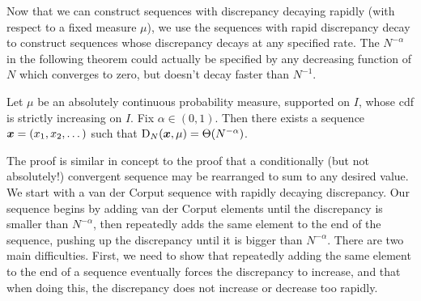 Now that we can construct sequences with discrepancy decaying rapidly (with 
respect to a fixed measure $\mu$), we use the sequences with rapid discrepancy 
decay to construct sequences whose discrepancy decays at any specified rate. 
The $N^{-\alpha}$ in the following theorem could actually be specified by any 
decreasing function of $N$ which converges to zero, but doesn't decay faster 
than $N^{-1}$. 

\begin{theorem}\label{thm:discrepancy-arbitrary}
Let $\mu$ be an absolutely continuous probability measure, supported on $I$, 
whose cdf is strictly increasing on $I$. Fix $\alpha\in (0,1)$. Then there 
exists a sequence ${\boldsymbol x}=(x_1,x_2,\dots)$ such that 
$\operatorname{D}_N({\boldsymbol x},\mu) = \Theta(N^{-\alpha})$. 
\end{theorem}

The proof is similar in concept to the proof that a conditionally (but not 
absolutely!) convergent sequence may be rearranged to sum to any desired value. 
We start with a van der Corput sequence with rapidly decaying discrepancy. Our 
sequence begins by adding van der Corput elements until the discrepancy is 
smaller than $N^{-\alpha}$, then repeatedly adds the same element to the end 
of the sequence, pushing up the discrepancy until it is bigger than 
$N^{-\alpha}$. There are two main difficulties. First, we need to show that 
repeatedly adding the same element to the end of a sequence eventually forces 
the discrepancy to increase, and that when doing this, the discrepancy does not 
increase or decrease too rapidly. 

